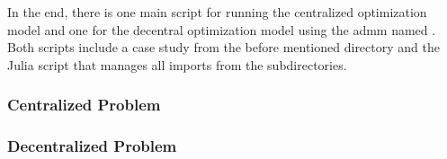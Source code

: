 In the end, there is one main script for running the centralized optimization model  and one for the decentral optimization model using the \gls{admm} named . Both scripts include a case study from the before mentioned directory and the Julia script  that manages all imports from the subdirectories.\\


\subsubsection{Centralized Problem}

\subsubsection{Decentralized Problem}

